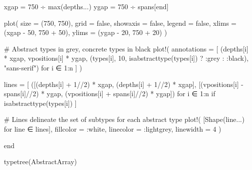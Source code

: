 \documentclass[
  letterpaper,
  DIV=11,
  numbers=noendperiod]{scrreprt}
\newenvironment{Shaded}{\begin{snugshade}}{\end{snugshade}}
\newcommand{\CommentTok}[1]{\textcolor[rgb]{0.37,0.37,0.37}{#1}}
\newcommand{\ConstantTok}[1]{\textcolor[rgb]{0.56,0.35,0.01}{#1}}
\newcommand{\DataTypeTok}[1]{\textcolor[rgb]{0.68,0.00,0.00}{#1}}
\newcommand{\FloatTok}[1]{\textcolor[rgb]{0.68,0.00,0.00}{#1}}
\newcommand{\FunctionTok}[1]{\textcolor[rgb]{0.28,0.35,0.67}{#1}}
\newcommand{\KeywordTok}[1]{\textcolor[rgb]{0.00,0.23,0.31}{#1}}
\newcommand{\NormalTok}[1]{\textcolor[rgb]{0.00,0.23,0.31}{#1}}
\newcommand{\OperatorTok}[1]{\textcolor[rgb]{0.37,0.37,0.37}{#1}}
\newcommand{\StringTok}[1]{\textcolor[rgb]{0.13,0.47,0.30}{#1}}
\begin{document}
\begin{Shaded}
\begin{Highlighting}[]
\NormalTok{    xgap }\OperatorTok{=} \FloatTok{750} \OperatorTok{÷} \FunctionTok{max}\NormalTok{(depths}\OperatorTok{...}\NormalTok{)}
\NormalTok{    ygap }\OperatorTok{=} \FloatTok{750} \OperatorTok{÷}\NormalTok{ spans[}\KeywordTok{end}\NormalTok{]}

    \FunctionTok{plot}\NormalTok{(}
\NormalTok{        size }\OperatorTok{=}\NormalTok{ (}\FloatTok{750}\NormalTok{, }\FloatTok{750}\NormalTok{),}
\NormalTok{        grid }\OperatorTok{=} \ConstantTok{false}\NormalTok{,}
\NormalTok{        showaxis }\OperatorTok{=} \ConstantTok{false}\NormalTok{,}
\NormalTok{        legend }\OperatorTok{=} \ConstantTok{false}\NormalTok{,}
\NormalTok{        xlims }\OperatorTok{=}\NormalTok{ (xgap }\OperatorTok{{-}} \FloatTok{50}\NormalTok{, }\FloatTok{750} \OperatorTok{+} \FloatTok{50}\NormalTok{),}
\NormalTok{        ylims }\OperatorTok{=}\NormalTok{ (ygap }\OperatorTok{{-}} \FloatTok{20}\NormalTok{, }\FloatTok{750} \OperatorTok{+} \FloatTok{20}\NormalTok{)}
\NormalTok{    )}

    \CommentTok{\# Abstract types in grey, concrete types in black}
    \FunctionTok{plot!}\NormalTok{(}
\NormalTok{        annotations }\OperatorTok{=}\NormalTok{ [}
\NormalTok{            (depths[i] }\OperatorTok{*}\NormalTok{ xgap, vpositions[i] }\OperatorTok{*}\NormalTok{ ygap,}
\NormalTok{            (types[i], }\FloatTok{10}\NormalTok{, }\FunctionTok{isabstracttype}\NormalTok{(types[i]) ? }\OperatorTok{:}\NormalTok{grey }\OperatorTok{:} \OperatorTok{:}\NormalTok{black), }\StringTok{"sans{-}serif"}\NormalTok{)}
\NormalTok{            for i }\OperatorTok{∈} \FloatTok{1}\OperatorTok{:}\NormalTok{n}
\NormalTok{        ]   }
\NormalTok{    )}

\NormalTok{    lines }\OperatorTok{=}\NormalTok{ [}
\NormalTok{        ([(depths[i] }\OperatorTok{+} \FloatTok{1}\OperatorTok{//}\FloatTok{2}\NormalTok{) }\OperatorTok{*}\NormalTok{ xgap, (depths[i] }\OperatorTok{+} \FloatTok{1}\OperatorTok{//}\FloatTok{2}\NormalTok{) }\OperatorTok{*}\NormalTok{ xgap],}
\NormalTok{        [(vpositions[i] }\OperatorTok{{-}}\NormalTok{ spans[i]}\OperatorTok{//}\FloatTok{2}\NormalTok{) }\OperatorTok{*}\NormalTok{ ygap, (vpositions[i] }\OperatorTok{+}\NormalTok{ spans[i]}\OperatorTok{//}\FloatTok{2}\NormalTok{) }\OperatorTok{*}\NormalTok{ ygap])}
\NormalTok{        for i }\OperatorTok{∈} \FloatTok{1}\OperatorTok{:}\NormalTok{n if }\FunctionTok{isabstracttype}\NormalTok{(types[i])}
\NormalTok{    ]}

    \CommentTok{\# Lines delineate the set of subtypes for each abstract type}
    \FunctionTok{plot!}\NormalTok{(}
\NormalTok{        [}\FunctionTok{Shape}\NormalTok{(line}\OperatorTok{...}\NormalTok{) for line }\OperatorTok{∈}\NormalTok{ lines],}
\NormalTok{        fillcolor }\OperatorTok{=} \OperatorTok{:}\NormalTok{white,}
\NormalTok{        linecolor }\OperatorTok{=} \OperatorTok{:}\NormalTok{lightgrey,}
\NormalTok{        linewidth }\OperatorTok{=} \FloatTok{4}
\NormalTok{    )}
    
\KeywordTok{end}

\FunctionTok{typetree}\NormalTok{(}\DataTypeTok{AbstractArray}\NormalTok{)}
\end{Highlighting}
\end{Shaded}
\end{document}
